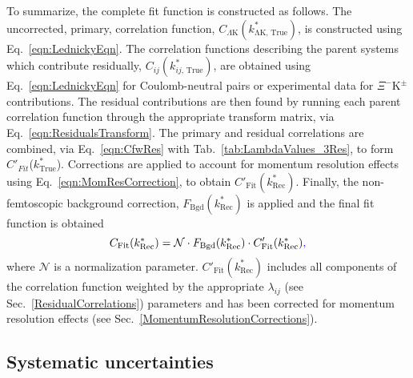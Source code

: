\documentclass[ALICE,manyauthors]{cernphprep}
\newcommand{\ktrue}{$k^{*}_{\mathrm{True}}$\xspace}
\newcommand{\XiKpm}{$\Xi^{-}\mathrm{K^{\pm}}$\xspace}
\begin{document}
To summarize, the complete fit function is constructed as follows.
The uncorrected, primary, correlation function, $C_{\Lambda\mathrm{K}}(k^{*}_{\mathrm{\Lambda K,\,True}})$, is constructed using Eq.~\ref{eqn:LednickyEqn}.
The correlation functions describing the parent systems which contribute residually, $C_{ij}(k^{*}_{ij,\,\mathrm{True}})$, are obtained using Eq.~\ref{eqn:LednickyEqn} for Coulomb-neutral pairs or experimental data for \XiKpm contributions.
The residual contributions are then found by running each parent correlation function through the appropriate transform matrix, via Eq.~\ref{eqn:ResidualsTransform}.
The primary and residual correlations are combined, via Eq.~\ref{eqn:CfwRes} with Tab.~\ref{tab:LambdaValues_3Res}, to form $C'_{Fit}$(\ktrue).
Corrections are applied to account for momentum resolution effects using Eq.~\ref{eqn:MomResCorrection}, to obtain $C'_{\mathrm{Fit}}(k^{*}_{\mathrm{Rec}})$.
Finally, the non-femtoscopic background correction, $F_{\mathrm{Bgd}}(k^{*}_{\mathrm{Rec}})${\color{blue}{,}} is applied and the final fit function is obtained{\color{blue}{,}}
\begin{equation}
C_{\mathrm{Fit}}(k^{*}_{\mathrm{Rec}}) = \mathcal{N}\cdot F_{\mathrm{Bgd}}(k^{*}_{\mathrm{Rec}})\cdot C'_{\mathrm{Fit}}(k^{*}_{\mathrm{Rec}}){\color{blue}{,}}
\end{equation}
where $\mathcal{N}$ is a normalization parameter.
$C'_{\mathrm{Fit}}(k^{*}_{\mathrm{Rec}})$ includes all components of the correlation function weighted by the appropriate $\lambda_{ij}$ (see Sec.~\ref{ResidualCorrelations}) parameters and has been corrected for momentum resolution effects (see Sec.~\ref{MomentumResolutionCorrections}).

\subsection{Systematic uncertainties}
\label{SysErrs}
\end{document}
